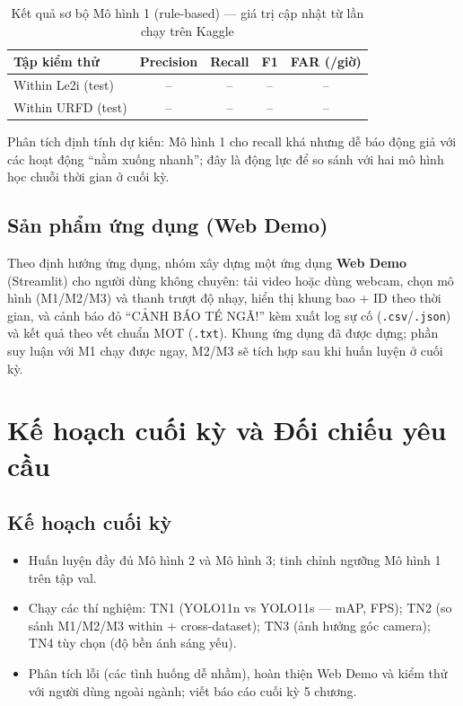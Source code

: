 \documentclass[fontsize=13pt,a4paper,oneside,DIV=calc,chapterprefix=true]{scrbook}
\begin{document}
\begin{table}[H]
\centering
\caption{Kết quả sơ bộ Mô hình 1 (rule-based) --- giá trị cập nhật từ lần chạy trên Kaggle}
\label{tab:prelim}
\small
\begin{tabular}{@{}lcccc@{}}
\toprule
\textbf{Tập kiểm thử} & \textbf{Precision} & \textbf{Recall} & \textbf{F1} & \textbf{FAR (/giờ)} \\
\midrule
Within Le2i (test) & -- & -- & -- & -- \\
Within URFD (test) & -- & -- & -- & -- \\
\bottomrule
\end{tabular}
\end{table}

\noindent Phân tích định tính dự kiến: Mô hình 1 cho recall khá nhưng dễ báo động giả với các hoạt động ``nằm xuống nhanh''; đây là động lực để so sánh với hai mô hình học chuỗi thời gian ở cuối kỳ.

\section{Sản phẩm ứng dụng (Web Demo)}
Theo định hướng ứng dụng, nhóm xây dựng một ứng dụng \textbf{Web Demo} (Streamlit) cho người dùng không chuyên: tải video hoặc dùng webcam, chọn mô hình (M1/M2/M3) và thanh trượt độ nhạy, hiển thị khung bao + ID theo thời gian, và cảnh báo đỏ ``CẢNH BÁO TÉ NGÃ!'' kèm xuất log sự cố (\texttt{.csv}/\texttt{.json}) và kết quả theo vết chuẩn MOT (\texttt{.txt}). Khung ứng dụng đã được dựng; phần suy luận với M1 chạy được ngay, M2/M3 sẽ tích hợp sau khi huấn luyện ở cuối kỳ.

\chapter{Kế hoạch cuối kỳ và Đối chiếu yêu cầu}
\label{chap:plan}

\section{Kế hoạch cuối kỳ}
\begin{itemize}[leftmargin=1.2cm]
    \item Huấn luyện đầy đủ Mô hình 2 và Mô hình 3; tinh chỉnh ngưỡng Mô hình 1 trên tập val.
    \item Chạy các thí nghiệm: TN1 (YOLO11n vs YOLO11s --- mAP, FPS); TN2 (so sánh M1/M2/M3 within + cross-dataset); TN3 (ảnh hưởng góc camera); TN4 tùy chọn (độ bền ánh sáng yếu).
    \item Phân tích lỗi (các tình huống dễ nhầm), hoàn thiện Web Demo và kiểm thử với người dùng ngoài ngành; viết báo cáo cuối kỳ 5 chương.
\end{itemize}
\end{document}
